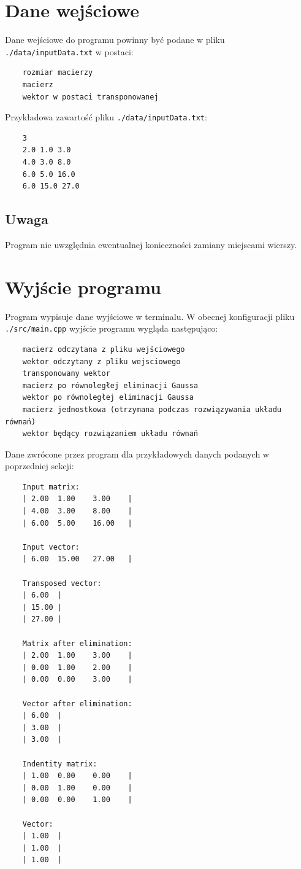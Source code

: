 \documentclass{article}
\begin{document}
\section{Dane wejściowe}

Dane wejściowe do programu powinny być podane w pliku \texttt{./data/inputData.txt} w postaci:

\begin{verbatim}
    rozmiar macierzy
    macierz
    wektor w postaci transponowanej
\end{verbatim}

Przykładowa zawartość pliku \texttt{./data/inputData.txt}:

\begin{verbatim}
    3
    2.0 1.0 3.0
    4.0 3.0 8.0
    6.0 5.0 16.0
    6.0 15.0 27.0
\end{verbatim}

\subsection{Uwaga}
Program nie uwzględnia ewentualnej konieczności zamiany miejscami wierszy.



\section{Wyjście programu}

Program wypisuje dane wyjściowe w terminalu. W obecnej konfiguracji pliku \texttt{./src/main.cpp} wyjście programu wygląda następująco:

\begin{verbatim}
    macierz odczytana z pliku wejściowego
    wektor odczytany z pliku wejsciowego
    transponowany wektor
    macierz po równoległej eliminacji Gaussa
    wektor po równoległej eliminacji Gaussa
    macierz jednostkowa (otrzymana podczas rozwiązywania układu równań)
    wektor będący rozwiązaniem układu równań
\end{verbatim}

Dane zwrócone przez program dla przykładowych danych podanych w poprzedniej sekcji:

\begin{verbatim}
    Input matrix:
    | 2.00  1.00    3.00    |
    | 4.00  3.00    8.00    |
    | 6.00  5.00    16.00   |

    Input vector:
    | 6.00  15.00   27.00   |

    Transposed vector:
    | 6.00  |
    | 15.00 |
    | 27.00 |

    Matrix after elimination:
    | 2.00  1.00    3.00    |
    | 0.00  1.00    2.00    |
    | 0.00  0.00    3.00    |

    Vector after elimination:
    | 6.00  |
    | 3.00  |
    | 3.00  |

    Indentity matrix:
    | 1.00  0.00    0.00    |
    | 0.00  1.00    0.00    |
    | 0.00  0.00    1.00    |

    Vector:
    | 1.00  |
    | 1.00  |
    | 1.00  |
\end{verbatim}
\end{document}
